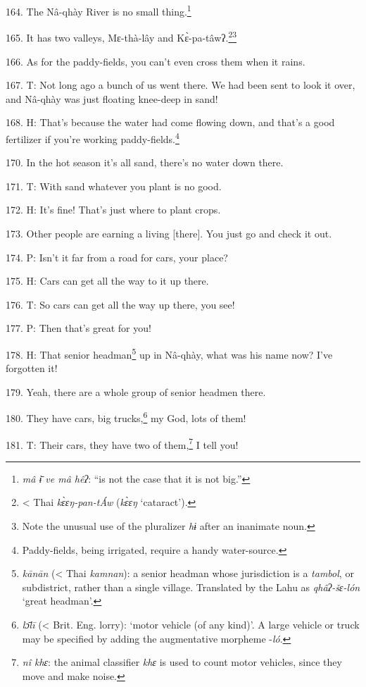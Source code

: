 164. The Nâ-qhày River is no small thing.\footnote{\textit{mâ ɨ̄ ve mâ hêʔ}: ``is not the case that it is not big.''}

165. It has two valleys, Mɛ-thà-lây and Kɛ̀-pa-tâwʔ.\footnote{< Thai \textit{kɛ̀ɛŋ-pan-tÁw} (\textit{kɛ̀ɛŋ} `cataract').}\footnote{Note the unusual use of the pluralizer \textit{hɨ} after an inanimate noun.}

166. As for the paddy-fields, you can't even cross them when it rains.

167. T: Not long ago a bunch of us went there. We had been sent to look it over,
and Nâ-qhày was just floating knee-deep in sand!

168. H: That's because the water had come flowing down, and that's a good fertilizer
if you're working paddy-fields.\footnote{Paddy-fields, being irrigated, require a handy water-source.}

170. In the hot season it's all sand, there's no water down there.

171. T: With sand whatever you plant is no good.

172. H: It's fine! That's just where to plant crops.

173. Other people are earning a living [there]. You just go and check it out.

174. P: Isn't it far from a road for cars, your place?

175. H: Cars can get all the way to it up there.

176. T: So cars can get all the way up there, you see!

177. P: Then that's great for you!

178. H: That senior headman\footnote{\textit{kānān} (< Thai \textit{kamnan}): a senior headman whose jurisdiction is a \textit{tambol}, or subdistrict, rather than a single village. Translated by the Lahu as \textit{qhâʔ-šɛ-lón }`great headman'.} up in Nâ-qhày, what was his name now? I've forgotten
it!

179. Yeah, there are a whole group of senior headmen there.

180. They have cars, big trucks,\footnote{\textit{lɔ̄lī} (< Brit. Eng. lorry): `motor vehicle (of any kind)'. A large vehicle or truck may be specified by adding the augmentative morpheme -\textit{ló}.} my God, lots of them!

181. T: Their cars, they have two of them,\footnote{\textit{nî khɛ}: the animal classifier \textit{khɛ} is used to count motor vehicles, since they move and make noise.} I tell you!

